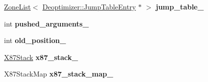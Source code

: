 \begin{DoxyCompactItemize}
\item 
\hyperlink{classv8_1_1internal_1_1_zone_list}{Zone\+List}$<$ \hyperlink{structv8_1_1internal_1_1_deoptimizer_1_1_jump_table_entry}{Deoptimizer\+::\+Jump\+Table\+Entry} $\ast$ $>$ {\bfseries jump\+\_\+table\+\_\+}\hypertarget{classv8_1_1internal_1_1_l_code_gen_ad48abf27f6cce7110bdc1fb64ef81000}{}\label{classv8_1_1internal_1_1_l_code_gen_ad48abf27f6cce7110bdc1fb64ef81000}

\item 
int {\bfseries pushed\+\_\+arguments\+\_\+}\hypertarget{classv8_1_1internal_1_1_l_code_gen_aff12058845369256aca889388dfe2ac6}{}\label{classv8_1_1internal_1_1_l_code_gen_aff12058845369256aca889388dfe2ac6}

\item 
int {\bfseries old\+\_\+position\+\_\+}\hypertarget{classv8_1_1internal_1_1_l_code_gen_aadc1cf1ec6c720270477dcd325811faf}{}\label{classv8_1_1internal_1_1_l_code_gen_aadc1cf1ec6c720270477dcd325811faf}

\item 
\hyperlink{classv8_1_1internal_1_1_l_code_gen_1_1_x87_stack}{X87\+Stack} {\bfseries x87\+\_\+stack\+\_\+}\hypertarget{classv8_1_1internal_1_1_l_code_gen_afa96e81d7fc35a459d7534816f56d2d4}{}\label{classv8_1_1internal_1_1_l_code_gen_afa96e81d7fc35a459d7534816f56d2d4}

\item 
X87\+Stack\+Map {\bfseries x87\+\_\+stack\+\_\+map\+\_\+}\hypertarget{classv8_1_1internal_1_1_l_code_gen_aa3229fa586e9c4fb6d881cfed29f87fa}{}\label{classv8_1_1internal_1_1_l_code_gen_aa3229fa586e9c4fb6d881cfed29f87fa}

\end{DoxyCompactItemize}
